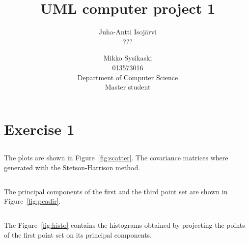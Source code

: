 \documentclass{article}
\begin{document}
\title{UML computer project 1}
\author{
Juha-Antti Isojärvi\\
???
\and
Mikko Sysikaski\\
013573016\\
Department of Computer Science\\
Master student}
\date{}
\maketitle

\section{Exercise 1}
\subsection{}
The plots are shown in Figure~\ref{fig:scatter}. The covariance matrices where generated with the Stetson-Harrison method.
\subsection{}
The principal components of the first and the third point set are shown in Figure~\ref{fig:pcadir}.
\subsection{}
The Figure~\ref{fig:histo} contains the histograms obtained by projecting the points of the first point set on its principal components.
\subsection{}
\subsection{}
\end{document}
